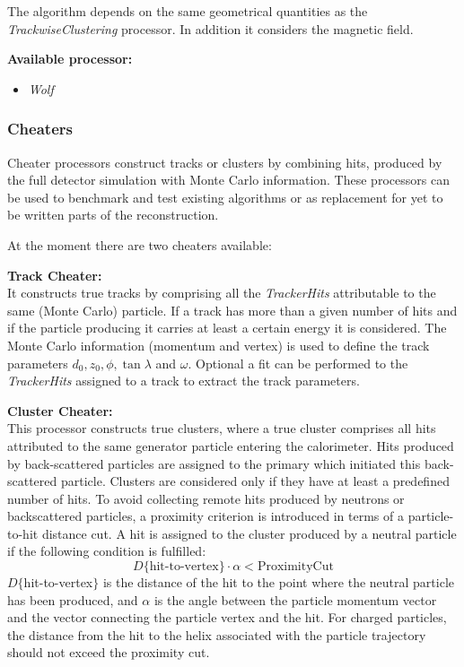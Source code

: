 The algorithm depends on the same geometrical quantities as the
{\em TrackwiseClustering} processor. In addition it considers the
magnetic field.

{\bf Available processor:}
\begin{itemize}
\item {\em Wolf}
\end{itemize}

\subsubsection{Cheaters}

Cheater processors construct tracks or clusters by combining hits, produced
by the full detector simulation with Monte Carlo information.
These processors can be used to benchmark and test existing algorithms
or as replacement for yet to be written parts of the reconstruction.

At the moment there are two cheaters available:

{\bf Track Cheater:} \\
It constructs true tracks by comprising all the {\em TrackerHits} attributable
to the same (Monte Carlo) particle. If a track has more than a given number of
hits and if the particle producing it carries at least a certain
energy it is considered. The Monte Carlo information
(momentum and vertex) is used to define the track parameters
$d_0, z_0, \phi, \tan\lambda$ and $\omega$.
Optional a fit can be performed to the {\em TrackerHits} assigned to a track
to extract the track parameters.

{\bf Cluster Cheater:} \\
This processor constructs true clusters, where a true cluster comprises all
hits attributed to the same generator particle entering
the calorimeter. Hits produced by back-scattered particles are assigned to the
primary which initiated this back-scattered particle.
Clusters are considered only if they have at least a predefined number of
hits.
To avoid collecting remote hits produced by neutrons or backscattered
particles, a proximity criterion is introduced in terms
of a particle-to-hit distance cut. A hit is assigned to the cluster
produced by a neutral particle if
the following condition is fulfilled:
$$
D\{\textrm{hit-to-vertex}\} \cdot \alpha < \textrm{ProximityCut}
$$
$D\{$hit-to-vertex$\}$ is the distance of the hit to the point
where the neutral particle has been produced, and $\alpha$ is the
angle between the particle momentum vector and the vector connecting
the particle vertex and the hit.
For charged particles, the distance from the hit to
the helix associated with the particle trajectory should
not exceed the proximity cut.

